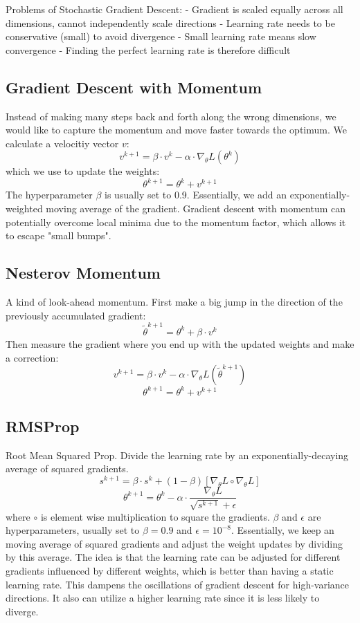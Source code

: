 \documentclass{scrartcl}
\begin{document}
Problems of Stochastic Gradient Descent:
- Gradient is scaled equally across all dimensions, cannot independently scale directions
- Learning rate needs to be conservative (small) to avoid divergence
- Small learning rate means slow convergence
- Finding the perfect learning rate is therefore difficult

\subsection*{Gradient Descent with Momentum}
Instead of making many steps back and forth along the wrong dimensions, we would like to capture the momentum and move faster towards the optimum.
We calculate a velocitiy vector $v$:
$$v^{k+1} = \beta \cdot v^k - \alpha \cdot \nabla_\theta L(\theta^k)$$
which we use to update the weights:
$$\theta^{k+1} = \theta^k + v^{k+1}$$
The hyperparameter $\beta$ is usually set to 0.9.
Essentially, we add an exponentially-weighted moving average of the gradient.
Gradient descent with momentum can potentially overcome local minima due to the momentum factor, which allows it to escape "small bumps".

\subsection*{Nesterov Momentum}
A kind of look-ahead momentum.
First make a big jump in the direction of the previously accumulated gradient:
$$\widetilde{\theta}^{k+1} = \theta^k + \beta \cdot v^k$$
Then measure the gradient where you end up with the updated weights and make a correction:
$$v^{k+1} = \beta \cdot v^k - \alpha \cdot \nabla_\theta L(\widetilde{\theta}^{k+1})$$
$$\theta^{k+1} = \theta^k + v^{k+1}$$

\subsection*{RMSProp}
Root Mean Squared Prop.
Divide the learning rate by an exponentially-decaying average of squared gradients.
$$s^{k+1} = \beta \cdot s^k + (1-\beta)[\nabla_\theta L \circ \nabla_\theta L]$$
$$\theta^{k+1} = \theta^k - \alpha \cdot \frac{\nabla_\theta L}{\sqrt{s^{k+1}} + \epsilon}$$
where $\circ$ is element wise multiplication to square the gradients. $\beta$ and $\epsilon$ are hyperparameters, usually set to $\beta = 0.9$ and $\epsilon = 10^{-8}$.
Essentially, we keep an moving average of squared gradients and adjust the weight updates by dividing by this average. The idea is that the learning rate can be adjusted for different gradients influenced by different weights, which is better than having a static learning rate.
This dampens the oscillations of gradient descent for high-variance directions.
It also can utilize a higher learning rate since it is less likely to diverge.
\end{document}
